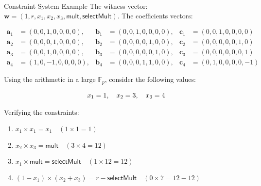 \documentclass{zkdl-presentation-template}
\begin{document}
    \begin{frame}[fragile]{Constraint System Example}
        The witness vector: $\mathbf{w} = (1, r, x_1, x_2, x_3, \mathsf{mult}, \mathsf{selectMult})$. The coefficients vectors:
        
        \vspace{-20pt}

        \begin{align*}
            \mathbf{a}_1 &= (0, 0, 1, 0, 0, 0, 0), & \mathbf{b}_1 &= (0, 0, 1, 0, 0, 0, 0), & \mathbf{c}_1 &= (0, 0, 1, 0, 0, 0, 0) \\
            \mathbf{a}_2 &= (0, 0, 0, 1, 0, 0, 0), & \mathbf{b}_2 &= (0, 0, 0, 0, 1, 0, 0), & \mathbf{c}_2 &= (0, 0, 0, 0, 0, 1, 0) \\
            \mathbf{a}_3 &= (0, 0, 1, 0, 0, 0, 0), & \mathbf{b}_3 &= (0, 0, 0, 0, 0, 1, 0), & \mathbf{c}_3 &= (0, 0, 0, 0, 0, 0, 1) \\
            \mathbf{a}_4 &= (1, 0, -1, 0, 0, 0, 0), & \mathbf{b}_4 &= (0, 0, 0, 1, 1, 0, 0), & \mathbf{c}_4 &= (0, 1, 0, 0, 0, 0, -1)
        \end{align*}

        \vspace{-10pt}

        Using the arithmetic in a large $\mathbb{F}_p$, consider the following values:
        
        \vspace{-15pt}
        \begin{equation*}
            x_1 = 1, \quad x_2 = 3, \quad x_3 = 4
            \vspace{-5pt}
        \end{equation*}
    
        Verifying the constraints:
        \begin{enumerate}
            \item \( x_1 \times x_1 = x_1 \quad (1 \times 1 = 1) \)
            \item \( x_2 \times x_3 = \mathsf{mult} \quad (3 \times 4 = 12) \)
            \item \( x_1 \times \mathsf{mult} = \mathsf{selectMult} \quad (1 \times 12 = 12) \)
            \item \( (1 - x_1) \times (x_2 + x_3) = r - \mathsf{selectMult} \quad (0 \times 7 = 12 - 12) \)
        \end{enumerate}
    \end{frame}
\end{document}
